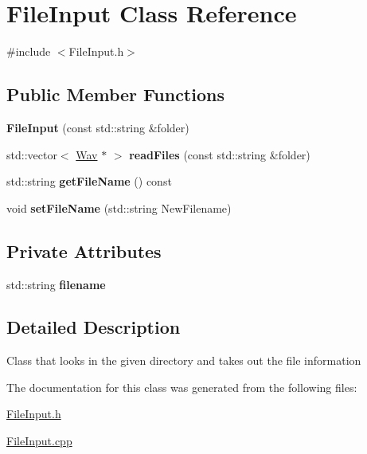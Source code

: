 \hypertarget{classFileInput}{}\section{File\+Input Class Reference}
\label{classFileInput}


{\ttfamily \#include $<$File\+Input.\+h$>$}

\subsection*{Public Member Functions}
\begin{DoxyCompactItemize}
\item 
\mbox{\label{classFileInput_acfe2e83252e8f26a6ab0da1c75d957d9}} 
{\bfseries File\+Input} (const std\+::string \&folder)
\item 
\mbox{\label{classFileInput_a5770ce4ba79c791f42c37c8f246f7bf2}} 
std\+::vector$<$ \hyperlink{classWav}{Wav} $\ast$ $>$ {\bfseries read\+Files} (const std\+::string \&folder)
\item 
\mbox{\label{classFileInput_ae1ad8c30922657be5af46c86711fe143}} 
std\+::string {\bfseries get\+File\+Name} () const
\item 
\mbox{\label{classFileInput_a0923074127521bc76eed465cedca573c}} 
void {\bfseries set\+File\+Name} (std\+::string New\+Filename)
\end{DoxyCompactItemize}
\subsection*{Private Attributes}
\begin{DoxyCompactItemize}
\item 
\mbox{\label{classFileInput_a6c16d6479746c25b431c60dd335a3916}} 
std\+::string {\bfseries filename}
\end{DoxyCompactItemize}


\subsection{Detailed Description}
Class that looks in the given directory and takes out the file information 

The documentation for this class was generated from the following files\+:\begin{DoxyCompactItemize}
\item 
\hyperlink{FileInput_8h}{File\+Input.\+h}\item 
\hyperlink{FileInput_8cpp}{File\+Input.\+cpp}\end{DoxyCompactItemize}

